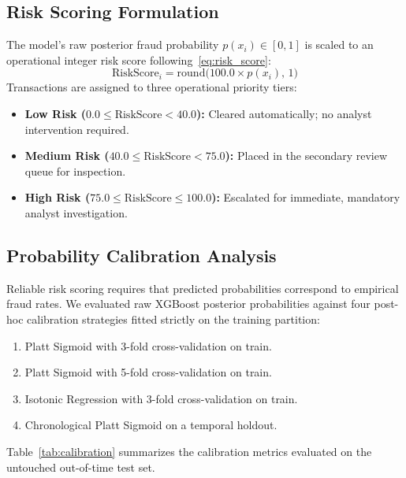 \documentclass[conference]{IEEEtran}
\begin{document}
\subsection{Risk Scoring Formulation}
The model's raw posterior fraud probability $p(x_i) \in [0, 1]$ is scaled to an operational integer risk score following~\eqref{eq:risk_score}:
\begin{equation}
\text{RiskScore}_i = \text{round}\big( 100.0 \times p(x_i), \, 1 \big)
\label{eq:risk_score}
\end{equation}
Transactions are assigned to three operational priority tiers:
\begin{itemize}
    \item \textbf{Low Risk ($0.0 \le \text{RiskScore} < 40.0$):} Cleared automatically; no analyst intervention required.
    \item \textbf{Medium Risk ($40.0 \le \text{RiskScore} < 75.0$):} Placed in the secondary review queue for inspection.
    \item \textbf{High Risk ($75.0 \le \text{RiskScore} \le 100.0$):} Escalated for immediate, mandatory analyst investigation.
\end{itemize}

\subsection{Probability Calibration Analysis}
Reliable risk scoring requires that predicted probabilities correspond to empirical fraud rates. We evaluated raw XGBoost posterior probabilities against four post-hoc calibration strategies fitted strictly on the training partition:
\begin{enumerate}
    \item Platt Sigmoid with 3-fold cross-validation on train.
    \item Platt Sigmoid with 5-fold cross-validation on train.
    \item Isotonic Regression with 3-fold cross-validation on train.
    \item Chronological Platt Sigmoid on a temporal holdout.
\end{enumerate}

Table~\ref{tab:calibration} summarizes the calibration metrics evaluated on the untouched out-of-time test set.
\end{document}
